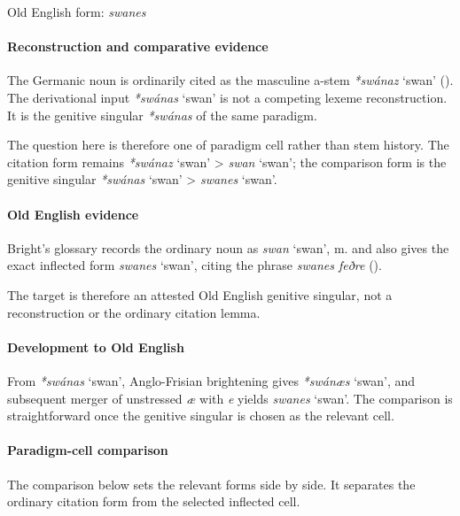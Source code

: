 \documentclass[
  british,
  a4paper,
]{article}
\providecommand{\Recon}[1]{\emph{*#1}}
\begin{document}
Old English form: \emph{swanes}

\paragraph{Reconstruction and comparative
evidence}\label{reconstruction-and-comparative-evidence-115}

The Germanic noun is ordinarily cited as the masculine a-stem
\Recon{swánaz} `swan' (). The
derivational input \Recon{swánas} `swan' is not a competing lexeme
reconstruction. It is the genitive singular \Recon{swánas} of the same
paradigm.

The question here is therefore one of paradigm cell rather than stem
history. The citation form remains \Recon{swánaz} `swan' \textgreater{}
{\emph{swan}} `swan'; the comparison form is the genitive singular
\Recon{swánas} `swan' \textgreater{} {\emph{swanes}} `swan'.

\paragraph{Old English evidence}\label{old-english-evidence-117}

Bright's glossary records the ordinary noun as {\emph{swan}} `swan', m.
and also gives the exact inflected form {\emph{swanes}} `swan', citing
the phrase \emph{swanes feðre}
().

The target is therefore an attested Old English genitive singular, not a
reconstruction or the ordinary citation lemma.

\paragraph{Development to Old
English}\label{development-to-old-english-115}

From \Recon{swánas} `swan', Anglo-Frisian brightening gives
\Recon{swánæs} `swan', and subsequent merger of unstressed \emph{æ} with
\emph{e} yields \emph{swanes} `swan'. The comparison is straightforward
once the genitive singular is chosen as the relevant cell.

\paragraph{Paradigm-cell comparison}\label{paradigm-cell-comparison}

The comparison below sets the relevant forms side by side. It separates
the ordinary citation form from the selected inflected cell.
\end{document}
